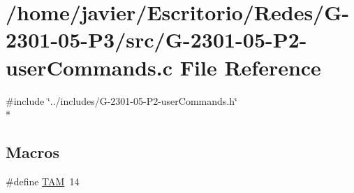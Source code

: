 \hypertarget{_g-2301-05-_p2-user_commands_8c}{\section{/home/javier/\-Escritorio/\-Redes/\-G-\/2301-\/05-\/\-P3/src/\-G-\/2301-\/05-\/\-P2-\/user\-Commands.c File Reference}
\label{_g-2301-05-_p2-user_commands_8c}
}
{\ttfamily \#include \char`\"{}../includes/\-G-\/2301-\/05-\/\-P2-\/user\-Commands.\-h\char`\"{}}\\*
\subsection*{Macros}
\begin{DoxyCompactItemize}
\item 
\#define \hyperlink{_g-2301-05-_p2-user_commands_8c_ae0b4816fb45161ef9da5e6d6134ee28a}{T\-A\-M}~14
\end{DoxyCompactItemize}

